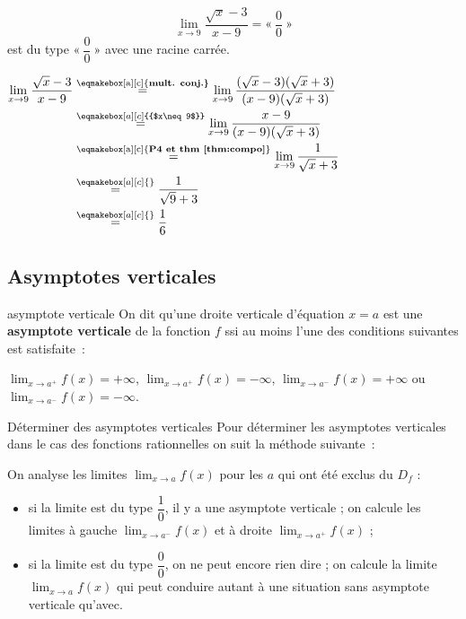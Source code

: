\documentclass[a4paper,12pt]{article}
\begin{document}
\begin{exemple}
\tcblower
\[
\lim_{x\to9}\dfrac{\sqrt{x}-3}{x-9}
=«~\dfrac{0}{0}~»\]
est du type $«~\dfrac{0}{0}~»$ avec une racine carrée.

$
\begin{aligned}
	\displaystyle{\lim_{x\to9}\dfrac{\sqrt{x}-3}{x-9}}
&\stackrel{\text{\eqmakebox[a][c]{\bfseries mult. conj.}}}{=}
\displaystyle{\lim_{x\to9}\dfrac{(\sqrt{x}-3)(\sqrt{x}+3)}{(x-9)(\sqrt{x}+3)}}\\
&\stackrel{\eqmakebox[a][c]{{$x\neq9$}}}{=}
\displaystyle{\lim_{x\to9}\dfrac{x-9}{(x-9)(\sqrt{x}+3)}}\\
&\stackrel{\text{\eqmakebox[a][c]{{\bfseries P4 et thm \ref{thm:compo}}}}}{=}
\displaystyle{\lim_{x\to9}\dfrac{1}{\sqrt{x}+3}}\\
&\stackrel{\eqmakebox[a][c]{}}{=}
\dfrac{1}{\sqrt{9}+3}\\
&\stackrel{\eqmakebox[a][c]{}}{=}\dfrac{1}{6}
\end{aligned}
$
\end{exemple}


\subsection{Asymptotes verticales}
\begin{definition}
	asymptote
	verticale
	\tcblower
On dit qu'une droite verticale d'équation $x = a$ est une \textbf{asymptote verticale} de la fonction $f$ ssi au moins l'une des conditions suivantes est satisfaite~:

$\displaystyle\lim_{x \to a^+} f(x) = +\infty$,  $\displaystyle\lim_{x \to a^+} f(x) = -\infty$,  $\displaystyle\lim_{x \to a^-} f(x) = +\infty$ ou  $\displaystyle\lim_{x \to a^-} f(x) = -\infty$.
\end{definition}


\begin{methode}
	Déterminer des asymptotes verticales
	\tcblower
Pour déterminer les asymptotes verticales dans le cas des fonctions rationnelles on suit la méthode suivante~:

On analyse les limites $\displaystyle\lim_{x \to a} f(x)$ pour les $a$ qui ont été exclus du $D_f$ :
\begin{itemize}
\item si la limite est du type $\dfrac{1}{0}$, il y a une asymptote verticale ; on calcule les limites à gauche $\displaystyle\lim_{x \to a^-} f(x)$ et à droite $\displaystyle\lim_{x \to a^+} f(x)$ ;
\item si la limite est du type $\dfrac{0}{0}$, on ne peut encore rien dire ; on calcule la limite $\displaystyle\lim_{x \to a} f(x)$ qui peut conduire autant à une situation sans asymptote verticale qu'avec.
\end{itemize}
\end{methode}
\end{document}

